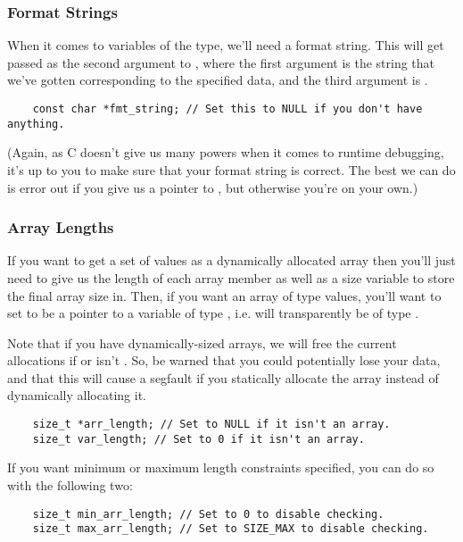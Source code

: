 \subsubsection{Format Strings}

When it comes to variables of the  type, we'll need a format string. This will get passed as the second argument to , where the first argument is the string that we've gotten corresponding to the specified data, and the third argument is . 

\begin{verbatim}
	const char *fmt_string; // Set this to NULL if you don't have anything.
\end{verbatim}

(Again, as C doesn't give us many powers when it comes to runtime debugging, it's up to you to make sure that your format string is correct. The best we can do is error out if you give us a pointer to , but otherwise you're on your own.)

\subsubsection{Array Lengths}
\label{sec:arr-discussion}

If you want to get a set of values as a dynamically allocated array then you'll just need to give us the length of each array member as well as a size variable to store the final array size in. Then, if you want an array of type  values, you'll want to set  to be a pointer to a variable of type , i.e.  will transparently be of type .

Note that if you have dynamically-sized arrays, we will free the current allocations if  or  isn't . So, be warned that you could potentially lose your data, and that this will cause a segfault if you statically allocate the array instead of dynamically allocating it.

\begin{verbatim}
	size_t *arr_length; // Set to NULL if it isn't an array.
	size_t var_length; // Set to 0 if it isn't an array.
\end{verbatim}

If you want minimum or maximum length constraints specified, you can do so with the following two:

\begin{verbatim}
	size_t min_arr_length; // Set to 0 to disable checking.
	size_t max_arr_length; // Set to SIZE_MAX to disable checking.
\end{verbatim}

